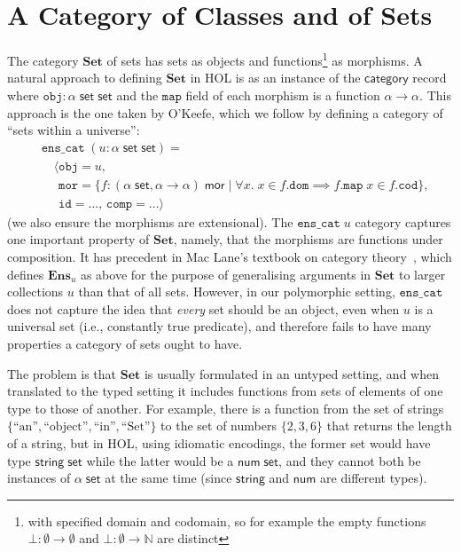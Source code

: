 \documentclass[twoside,titlepage,11pt]{article}
\begin{document}
\section{A Category of Classes and of Sets}%
\label{Set}
\newcommand{\Set}{\ensuremath{\mathbf{Set}}}
The category $\Set$ of sets has sets as objects and functions\footnote{with specified domain and codomain, so for example the empty functions $\bot:\emptyset\to\emptyset$ and $\bot:\emptyset\to\mathbb{N}$ are distinct} as morphisms.
A natural approach to defining $\Set$ in HOL is as an instance of the $\mathsf{category}$ record where $\mathtt{obj}:\alpha\;\mathsf{set}\;\mathsf{set}$ and the $\mathtt{map}$ field of each morphism is a function $\alpha\to\alpha$.
This approach is the one taken by O'Keefe, which we follow by defining a category of ``sets within a universe'':
\begin{align*}
&\mathtt{ens\_cat}\;(u:\alpha\;\mathsf{set}\;\mathsf{set})=\\
&\quad\langle\mathtt{obj}=u,\\
&\quad\phantom{\langle}\mathtt{mor}=\{f:(\alpha\;\mathsf{set},\alpha\to\alpha)\;\mathsf{mor}\mid \forall{x}.\;x\in f.\mathtt{dom}\implies f.\mathtt{map}\;x\in f.\mathtt{cod}\},\\
&\quad\phantom{\langle}\mathtt{id}=\dots,\,\mathtt{comp}=\dots\rangle
\end{align*}
(we also ensure the morphisms are extensional).
The $\mathtt{ens\_cat}\;u$ category captures one important property of $\Set$, namely, that the morphisms are functions under composition.
It has precedent in Mac Lane's textbook on category theory~\cite{MacLaneCFTWM}, which defines $\mathbf{Ens}_u$ as above for the purpose of generalising arguments in $\Set$ to larger collections $u$ than that of all sets.
However, in our polymorphic setting, $\mathtt{ens\_cat}$ does not capture the idea that \emph{every} set should be an object, even when $u$ is a universal set (i.e., constantly true predicate), and therefore fails to have many properties a category of sets ought to have.

The problem is that $\Set$ is usually formulated in an untyped setting, and when translated to the typed setting it includes functions from sets of elements of one type to those of another.
For example, there is a function from the set of strings $\{\text{``an''},\text{``object''},\text{``in''},\text{``Set''}\}$ to the set of numbers $\{2,3,6\}$ that returns the length of a string, but in HOL, using idiomatic encodings, the former set would have type $\mathsf{string}\;\mathsf{set}$ while the latter would be a $\mathsf{num}\;\mathsf{set}$, and they cannot both be instances of $\alpha\;\mathsf{set}$ at the same time (since $\mathsf{string}$ and $\mathsf{num}$ are different types).
\end{document}
